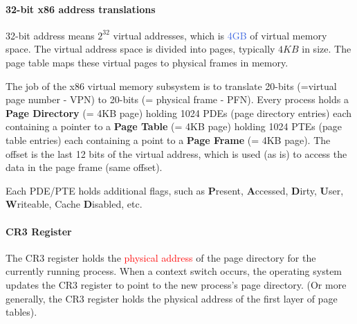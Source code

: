 \documentclass[openany,12pt]{book}
\newcommand{\red}[1]{\textcolor{Red}{#1}}
\newcommand{\blue}[1]{\textcolor{RoyalBlue}{#1}}
\begin{document}
\paragraph{32-bit x86 address translations} 32-bit address means \(2^{32}\) virtual addresses, which is \blue{4GB} of virtual memory space. The virtual address space is divided into pages, typically \(4KB\) in size. The page table maps these virtual pages to physical frames in memory.

\vspace*{0.5em} 

The job of the x86 virtual memory subsystem is to translate 20-bits (=virtual page number - VPN) to 20-bits (= physical frame - PFN). Every process holds a \textbf{Page Directory} (= 4KB page) holding 1024 PDEs (page directory entries) each containing a pointer to a \textbf{Page Table} (= 4KB page) holding 1024 PTEs (page table entries) each containing a point to a \textbf{Page Frame} (= 4KB page). The offset is the last 12 bits of the virtual address, which is used (as is) to access the data in the page frame (same offset).

\vspace*{0.5em} 

Each PDE/PTE holds additional flags, such as \textbf{P}resent, \textbf{A}ccessed, \textbf{D}irty, \textbf{U}ser, \textbf{W}riteable, Cache \textbf{D}isabled, etc. 

\paragraph{CR3 Register} The CR3 register holds the \red{physical address} of the page directory for the currently running process. When a context switch occurs, the operating system updates the CR3 register to point to the new process's page directory. (Or more generally, the CR3 register holds the physical address of the first layer of page tables).
\end{document}
